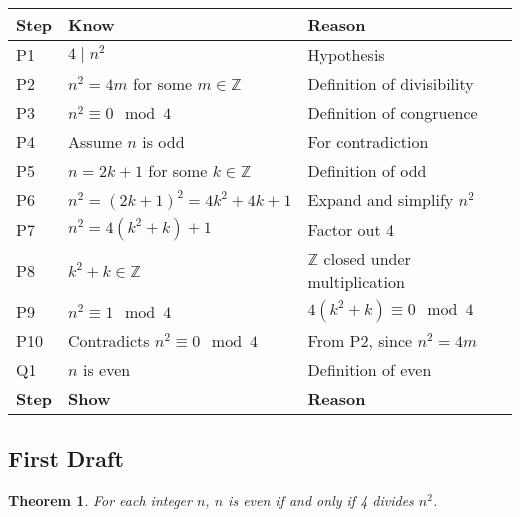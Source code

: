 \documentclass[12pt]{article}
\newtheorem*{theorem}{Theorem}
\theoremstyle{definition}
\begin{document}
\begin{center}
    \begin{tabular}{|p{}|p{}|p{}|}
    \hline
    \textbf{Step} & \textbf{Know} & \textbf{Reason} \\
    \hline
        P1 & \( 4 \mid n^2 \) & Hypothesis \\
    \hline
        P2 & \( n^2 = 4m \) for some \( m \in \mathbb{Z} \) & Definition of divisibility \\
    \hline
        P3 & \( n^2 \equiv 0 \mod 4 \) & Definition of congruence \\
    \hline
        P4 & Assume \( n \) is odd & For contradiction \\
    \hline
        P5 & \( n = 2k + 1 \) for some \( k \in \mathbb{Z} \) & Definition of odd \\
    \hline
        P6 & \( n^2 = (2k + 1)^2 = 4k^2 + 4k + 1 \) & Expand and simplify \( n^2 \) \\
    \hline
        P7 & \( n^2 = 4(k^2 + k) + 1 \) & Factor out 4 \\
    \hline
        P8 & \( k^2 + k \in \mathbb{Z} \) & \( \mathbb{Z}\) closed under multiplication \\
    \hline
        P9 & \( n^2 \equiv 1 \mod 4 \) & \( 4(k^2 + k) \equiv 0 \mod 4 \) \\
    \hline
        P10 & Contradicts \( n^2 \equiv 0 \mod 4 \) & From P2, since \( n^2 = 4m \) \\
    \hline
        Q1 & \( n \) is even & Definition of even \\
    \hline
    \textbf{Step} & \textbf{Show} & \textbf{Reason} \\
    \hline
    \end{tabular}
\end{center}

\subsection{First Draft}


\begin{theorem}
    For each integer \( n \), \( n \) is even if and only if 4 divides \( n^2 \).
\end{theorem}

\end{document}
